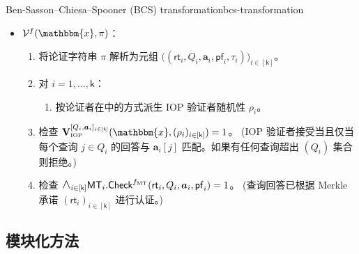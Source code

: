 \documentclass[american,singlepageview]{snargs-book-zh}
\renewcommand{\enspace}{\ensuremath{\thinspace}}
\newcommand{\DefineEqual}{\coloneqq}
\renewcommand{\vec}[1]{\bm{#1}}
\newcommand{\idxland}[1]{\scalebox{1.3}{$\land$}_{#1}}
\newcommand{\Instance}{\mathbbm{x}}
\newcommand{\ProtoVerifier}{V}
\newcommand{\ProtoSalt}{\tau}
\newcommand{\ProtoAlphabet}{\Sigma}
\newcommand{\ProtoRoundComplexity}{\mathsf{k}}
\newcommand{\RoundIndex}{i}
\newcommand{\IOPSubscript}{\scriptscriptstyle\mathrm{IOP}}
\newcommand{\IOPFormat}[1]{\mathbf{#1}}
\newcommand{\IOPVerifier}{\IOPFormat{\ProtoVerifier}_{\IOPSubscript}}
\newcommand{\IOPString}{\Pi}
\newcommand{\IOPEntry}{a}
\newcommand{\IOPEntries}{\vec{\IOPEntry}}
\newcommand{\IOPQueryIndex}{j}
\newcommand{\IOPQuerySet}{Q}
\newcommand{\IOPVerifierRandomMessage}{\rho}
\newcommand{\IOPRoundComplexity}{\ProtoRoundComplexity}
\newcommand{\IOPAlphabet}{\ProtoAlphabet}
\newcommand{\IOPVerifierRandomMessages}{(\IOPVerifierRandomMessage_{\RoundIndex})_{\RoundIndex \in [\IOPRoundComplexity]}}
\newcommand{\IOPTuple}[1]{(#1_{\RoundIndex})_{\RoundIndex \in [\IOPRoundComplexity]}}
\newcommand{\IOPVerifierInput}{\Instance,\IOPVerifierRandomMessages}
\newcommand{\IOPLocalView}[2]{[#1_{\RoundIndex},#2_{\RoundIndex}]_{\RoundIndex \in [\IOPRoundComplexity]}}
\newcommand{\ARGFormat}[1]{\mathcal{#1}}
\newcommand{\ARGVerifier}{\ARGFormat{\ProtoVerifier}}
\newcommand{\ARGString}{\pi}
\newcommand{\ROFunction}{f}
\newcommand{\ROTreeSymbol}{\MTSubscript}
\newcommand{\ROTreeFunction}{\ROFunction_{\ROTreeSymbol}}
\newcommand{\MTSymbol}{\mathsf{MT}}
\newcommand{\MTSubscript}{{\scriptscriptstyle\mathrm{MT}}}
\newcommand{\MTCommitment}{\mathsf{rt}}
\newcommand{\MTTrapdoor}{\mathsf{td}}
\newcommand{\MTProof}{\mathsf{pf}}
\newcommand{\MTIdxOpen}[1]{\MTSymbol_{#1}.\mathsf{Open}}
\newcommand{\MTIdxCheck}[1]{\MTSymbol_{#1}.\mathsf{Check}}
\newcommand{\RandSaltString}{\ProtoSalt}
\newcommand{\BCSText}{Ben-Sasson--Chiesa--Spooner (BCS) transformation\xspace}
\newcommand{\BCSARGString}{\big((\MTCommitment_{\RoundIndex},\IOPQuerySet_{\RoundIndex},\IOPEntries_{\RoundIndex},\MTProof_{\RoundIndex},\RandSaltString_{\RoundIndex})\big)_{\RoundIndex \in [\IOPRoundComplexity]}}
\begin{document}
\begin{ImportantConstruction}{\BCSText}{bcs-transformation}
\begin{itemize}
\begin{enumerate}[nolistsep]
  \item 对每个 $\RoundIndex \in [\IOPRoundComplexity]$，设 $\IOPEntries_{\RoundIndex} \DefineEqual \IOPString_{\RoundIndex}[\IOPQuerySet_{\RoundIndex}] \in \IOPAlphabet^{\IOPQuerySet_{\RoundIndex}}$ 为第 $\RoundIndex$ 轮查询的回答。
  \item 对每个 $\RoundIndex \in [\IOPRoundComplexity]$，为 $\IOPEntries_{\RoundIndex}$ 计算打开证明：
  \begin{equation*}
  \MTProof_{\RoundIndex} \DefineEqual \MTIdxOpen{\RoundIndex}^{\ROTreeFunction}(\MTTrapdoor_{\RoundIndex},\IOPQuerySet_{\RoundIndex})
  \enspace.
  \end{equation*}
  \item \label{step:bcs-output-argument-string} 输出论证字符串 $\ARGString \DefineEqual \BCSARGString$。
  \end{enumerate}

  \item $\ARGVerifier^{\ROFunction}(\Instance,\ARGString)$：
\begin{enumerate}[nolistsep]
  \item 将论证字符串 $\ARGString$ 解析为元组 $\BCSARGString$。
  \item 对 $\RoundIndex=1,\dots,\IOPRoundComplexity$：
  \begin{enumerate}[nolistsep]
    \item 按论证者在中的方式派生 IOP 验证者随机性 $\IOPVerifierRandomMessage_{\RoundIndex}$。
  \end{enumerate}
  \item \label{step:bcs-check-iop-verifier} 检查 $\IOPVerifier^{\IOPLocalView{\IOPQuerySet}{\IOPEntries}}(\IOPVerifierInput)=1$。 (IOP 验证者接受当且仅当每个查询 $\IOPQueryIndex \in \IOPQuerySet_{\RoundIndex}$ 的回答与 $\IOPEntries_{\RoundIndex}[\IOPQueryIndex]$ 匹配。如果有任何查询超出 $(\IOPQuerySet_{\RoundIndex})$ 集合则拒绝。)
  \item 检查 $\idxland{\RoundIndex \in [\IOPRoundComplexity]} \MTIdxCheck{\RoundIndex}^{\ROTreeFunction}(\MTCommitment_{\RoundIndex},\IOPQuerySet_{\RoundIndex},\IOPEntries_{\RoundIndex},\MTProof_{\RoundIndex})=1$。 (查询回答已根据 Merkle 承诺 $\IOPTuple{\MTCommitment}$ 进行认证。)
\end{enumerate}

\end{itemize}
\end{ImportantConstruction}

\subsection{模块化方法}
\label{sec:bcs-modular-soundness-analysis}
\end{document}
